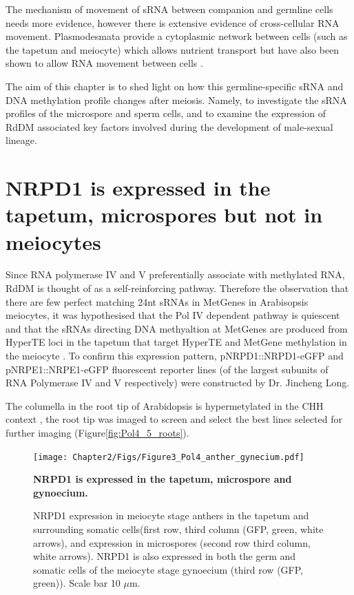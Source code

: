 The mechanism of movement of sRNA between companion and germline cells needs more evidence, however there is extensive evidence of cross-cellular RNA movement. Plasmodesmata provide a cytoplasmic network between cells (such as the tapetum and meiocyte) which allows nutrient transport but have also been shown to allow RNA movement between cells \cite{RN130,RN132,RN128}.

The aim of this chapter is to shed light on how this germline-specific sRNA and DNA methylation profile changes after meiosis. Namely, to investigate the sRNA profiles of the microspore and sperm cells, and to examine the expression of RdDM associated key factors involved during the development of male-sexual lineage.  

\section{NRPD1 is expressed in the tapetum, microspores but not in meiocytes}

Since RNA polymerase IV and V preferentially associate with methylated RNA, RdDM is thought of as a self-reinforcing pathway. Therefore the observation that there are few perfect matching 24nt sRNAs in MetGenes in Arabisopsis meiocytes, it was hypothesised that the Pol IV dependent pathway is quiescent and that the sRNAs directing DNA methyaltion at MetGenes are produced from HyperTE loci in the tapetum that target HyperTE and MetGene methylation in the meiocyte \cite{RN199,RN187}. To confirm this expression pattern, pNRPD1::NRPD1-eGFP and pNRPE1::NRPE1-eGFP fluorescent reporter lines (of the largest subunits of RNA Polymerase IV and V respectively\cite{RN33}) were constructed by Dr. Jincheng Long.

The columella in the root tip of Arabidopsis is hypermetylated in the CHH context \cite{RN261}, the root tip was imaged to screen and select the best lines selected for further imaging (Figure\ref{fig:Pol4_5_roots}).

\begin{figure}[htbp!] 
\centering    
    \texttt{[image: Chapter2/Figs/Figure3\_Pol4\_anther\_gynecium.pdf]}
\caption{\textbf{NRPD1 is expressed in the tapetum, microspore and gynoecium.}}
\label{fig:Pol4_anther}
\captionsetup{font=small}
    \caption*{NRPD1 expression in meiocyte stage anthers in the tapetum and surrounding somatic cells(first row, third column (GFP, green, white arrows), and expression in microspores (second row third column, white arrows). NRPD1 is also expressed in both the germ and somatic cells of the meiocyte stage gynoecium (third row (GFP, green)). Scale bar 10 $\mu$m.}
\end{figure}

